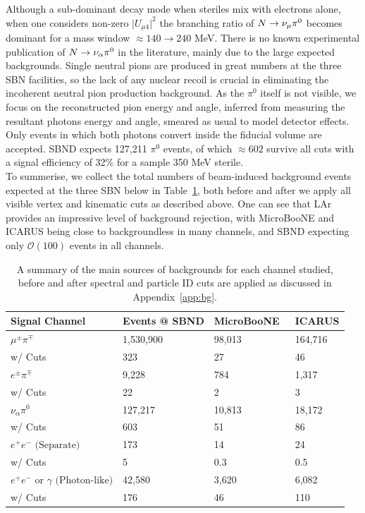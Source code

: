 \documentclass[11pt, a4paper]{article}
\newcommand{\refapp}[1]{Appendix~\ref{#1}}
\newcommand{\reftab}[1]{Table~\ref{#1}}
\def\muboone{MicroBooNE}
\def\ster{\ensuremath N}
\begin{document}
Although a sub-dominant decay mode when steriles mix with electrons alone, when
one considers non-zero $\vert U_{\mu4}\vert^2$ the branching ratio of $\ster
\rightarrow \nu_\mu \pi^0$ becomes dominant for a mass window $\approx 140
\rightarrow 240$ MeV. There is no known experimental publication of $\ster
\rightarrow \nu_\alpha \pi^0$ in the literature, mainly due to the large
expected backgrounds. Single neutral pions are produced in great numbers at the
three SBN facilities, so the lack of any nuclear recoil is crucial in
eliminating the incoherent neutral pion production background. As the $\pi^0$
itself is not visible, we focus on the reconstructed pion energy and angle,
inferred from measuring the resultant photons energy and angle, smeared as
usual to model detector effects. Only events in which both photons convert
inside the fiducial volume are accepted. SBND expects 127,211 $\pi^0$ events,
of which $\approx 602$ survive all cuts with a signal efficiency of 32\% for a
sample 350 MeV sterile. \\ 

To summerise, we collect the total numbers of beam-induced background events
expected at the three SBN below in \reftab{tab:Rates}, both before and after we
apply all visible vertex and kinematic cuts as described above. One can see
that LAr provides an impressive level of background rejection, with \muboone
and ICARUS being close to backgroundless in many channels, and SBND expecting
only $\mathcal{O}(100)$ events in all channels.

\begin{table}[t]
\centering
\begin{tabular}{ l | l |  l | l |  }
	Signal Channel & Events @ SBND & \muboone\ & ICARUS \\
\hline\hline
$\mu^\pm \pi^\mp$ &  1,530,900  & 98,013 & 164,716\\
													  w/ Cuts &323 & 27 & 46 \\ \hline
$ e^\pm \pi^\mp$ &  9,228  & 784 & 1,317\\
													  w/ Cuts &22 & 2 & 3 \\ \hline
$ \nu_\alpha \pi^0$ &   127,217 & 10,813 & 18,172\\
													  w/ Cuts &603 & 51 & 86 \\ \hline
$ e^+e^- \text{ (Separate)} $ & 173 & 14 & 24\\
													  w/ Cuts &5 & 0.3 & 0.5\\ \hline
$ e^+ e^- \text{ or } \gamma \text{ (Photon-like)}$ &  42,580 & 3,620 & 6,082\\
													  w/ Cuts &176 & 46 & 110 \\ 
 \hline \hline

\end{tabular}

\caption{\label{tab:Rates} A summary of the main sources of backgrounds for
each channel studied, before and after spectral and particle ID cuts are
applied as discussed in \refapp{app:bg}. }

\end{table}
\end{document}
